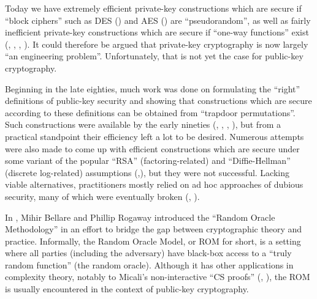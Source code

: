 
Today we have extremely efficient private-key constructions which
are secure if ``block ciphers'' such as DES (\cite{nist:des}) and AES
(\cite{nist:aes}) are ``pseudorandom'', as well as fairly inefficient
private-key constructions which are secure if ``one-way functions'' exist
(\cite{goldreich:pseudorandom1}, \cite{goldreich:pseudorandom2},
\cite{goldreich:pseudorandom3}, \cite{hastad:1waytopseudorandom}). It could
therefore be argued that private-key cryptography is now largely ``an
engineering problem''. Unfortunately, that is not yet the case for public-key
cryptography. 

Beginning in the late eighties, much work was done on formulating the
``right'' definitions of public-key security
and showing that constructions which are secure according to these definitions
can be obtained from ``trapdoor permutations''. Such constructions were
available by the early nineties (\cite{goldwasser:signatures2},
\cite{rompel:1waysigs}, \cite{naor:cca1}, \cite{rackoff:cca2}), but from a
practical standpoint their efficiency left a lot to be desired. Numerous
attempts were also made to come up with efficient constructions which are
secure under some variant of the popular ``RSA'' (factoring-related) and
``Diffie-Hellman'' (discrete log-related) assumptions
(\cite{boneh:rsaattacks},\cite{maurer:diffiehellman}), but they were not
successful.  Lacking viable alternatives, practitioners mostly relied on ad
hoc approaches of dubious security, many of which 
were eventually broken (\cite{brickell:iterknapsackbroken},
\cite{bleichenbacher:pkcsbroken}). 

In \cite{bellare:rompractical}, Mihir Bellare and Phillip Rogaway introduced
the ``Random Oracle Methodology'' in an effort to bridge the gap between
cryptographic theory and practice. Informally, the Random Oracle Model, or ROM
for short, is a setting where all parties (including the adversary) have
black-box access to a ``truly random function'' (the random oracle). Although
it has other applications in complexity theory, notably to Micali's
non-interactive ``CS proofs'' (\cite{micali:csproofs2},
\cite{micali:csproofs1}), the ROM is usually encountered in the context of
public-key cryptography. 

